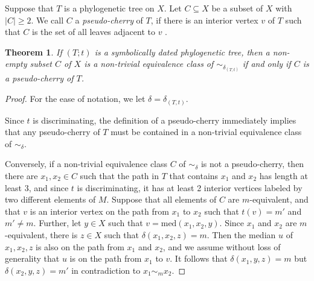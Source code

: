 \documentclass{article}
\newtheorem{theorem}{Theorem}
\begin{document}
Suppose that $T$ is a phylogenetic tree on $X$. Let $C\subseteq X$ be a
subset of $X$ with $|C| \ge 2$. 
We call $C$ a {\em pseudo-cherry} of $T$, if there is an interior vertex 
$v$ of $T$ such that $C$ is the set of all leaves adjacent to $v$ . 

\begin{theorem}
If $(T;t)$ is a symbolically dated phylogenetic tree, then 
a non-empty subset $C$ of $X$ is a non-trivial equivalence class of $\sim_{\delta_{(T,t)}}$
if and only if $C$ is a pseudo-cherry of $T$.

\end{theorem}

\begin{proof}
 For the ease of notation, we let $\delta = \delta_{(T,t)}$. 
 
 Since $t$ is discriminating, the definition of a pseudo-cherry 
 immediately implies that any pseudo-cherry of $T$ must be contained in a 
 non-trivial equivalence class of $\sim_{\delta}$.

Conversely, if a non-trivial equivalence class $C$ of $\sim_{\delta}$ is not a pseudo-cherry,
then there are $x_1,x_2 \in C$ such that the path in $T$ that contains $x_1$ and $x_2$ 
has length at least 3,  
and since $t$ is discriminating, it has at least 2 interior vertices labeled by two 
different elements of $M$. Suppose that all elements of $C$ are $m$-equivalent, and 
that $v$ is an interior vertex on the path from $x_1$ to $x_2$ such that $t(v)=m'$ and 
$m' \neq m$. Further, let $y \in X$ such that $v=\text{med}(x_1,x_2,y)$. Since $x_1$ and 
$x_2$ are $m$-equivalent, there is $z \in X$ such that $\delta(x_1,x_2,z)=m$. Then the 
median $u$ of $x_1,x_2,z$ is also on the path from $x_1$ and $x_2$, and we assume 
without loss of generality that 
$u$ is on the path from $x_1$ to $v$. It follows that $\delta(x_1,y,z) =m$ but $\delta(x_2,y,z)=m'$
in contradiction to $x_1\sim_mx_2$.
\end{proof}
\end{document}
